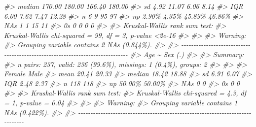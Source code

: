\documentclass[
]{book}
\newenvironment{Shaded}{\begin{snugshade}}{\end{snugshade}}
\newcommand{\CommentTok}[1]{\textcolor[rgb]{0.56,0.35,0.01}{\textit{#1}}}
\begin{document}
\begin{Shaded}
\begin{Highlighting}[]
\CommentTok{\#\textgreater{} median        170.00        180.00        166.40        180.00}
\CommentTok{\#\textgreater{} sd              4.92         11.07          6.06          8.14}
\CommentTok{\#\textgreater{} IQR             6.00          7.62          7.47         12.28}
\CommentTok{\#\textgreater{} n                  6             9            95            97}
\CommentTok{\#\textgreater{} np             2.90\%         4.35\%        45.89\%        46.86\%}
\CommentTok{\#\textgreater{} NAs                1             1            15            11}
\CommentTok{\#\textgreater{} 0s                 0             0             0             0}
\CommentTok{\#\textgreater{} }
\CommentTok{\#\textgreater{} Kruskal{-}Wallis rank sum test:}
\CommentTok{\#\textgreater{}   Kruskal{-}Wallis chi{-}squared = 99, df = 3, p{-}value \textless{}2e{-}16}
\CommentTok{\#\textgreater{} }
\CommentTok{\#\textgreater{} }
\CommentTok{\#\textgreater{} Warning:}
\CommentTok{\#\textgreater{}   Grouping variable contains 2 NAs (0.844\%).}
\CommentTok{\#\textgreater{} }
\CommentTok{\#\textgreater{} {-}{-}{-}{-}{-}{-}{-}{-}{-}{-}{-}{-}{-}{-}{-}{-}{-}{-}{-}{-}{-}{-}{-}{-}{-}{-}{-}{-}{-}{-}{-}{-}{-}{-}{-}{-}{-}{-}{-}{-}{-}{-}{-}{-}{-}{-}{-}{-}{-}{-}{-}{-}{-}{-}{-}{-}{-}{-}{-}{-}{-}{-}{-}{-}{-}{-}{-}{-}{-}{-}{-}{-}{-}{-}{-}{-}{-}{-} }
\CommentTok{\#\textgreater{} Age \textasciitilde{} Sex (.)}
\CommentTok{\#\textgreater{} }
\CommentTok{\#\textgreater{} Summary: }
\CommentTok{\#\textgreater{} n pairs: 237, valid: 236 (99.6\%), missings: 1 (0.4\%), groups: 2}
\CommentTok{\#\textgreater{} }
\CommentTok{\#\textgreater{}                       }
\CommentTok{\#\textgreater{}         Female    Male}
\CommentTok{\#\textgreater{} mean     20.41   20.33}
\CommentTok{\#\textgreater{} median   18.42   18.88}
\CommentTok{\#\textgreater{} sd        6.91    6.07}
\CommentTok{\#\textgreater{} IQR       2.48    2.37}
\CommentTok{\#\textgreater{} n          118     118}
\CommentTok{\#\textgreater{} np      50.00\%  50.00\%}
\CommentTok{\#\textgreater{} NAs          0       0}
\CommentTok{\#\textgreater{} 0s           0       0}
\CommentTok{\#\textgreater{} }
\CommentTok{\#\textgreater{} Kruskal{-}Wallis rank sum test:}
\CommentTok{\#\textgreater{}   Kruskal{-}Wallis chi{-}squared = 4.3, df = 1, p{-}value = 0.04}
\CommentTok{\#\textgreater{} }
\CommentTok{\#\textgreater{} }
\CommentTok{\#\textgreater{} Warning:}
\CommentTok{\#\textgreater{}   Grouping variable contains 1 NAs (0.422\%).}
\CommentTok{\#\textgreater{} }
\CommentTok{\#\textgreater{} {-}{-}{-}{-}{-}{-}{-}{-}{-}{-}{-}{-}{-}{-}{-}{-}{-}{-}{-}{-}{-}{-}{-}{-}{-}{-}{-}{-}{-}{-}{-}{-}{-}{-}{-}{-}{-}{-}{-}{-}{-}{-}{-}{-}{-}{-}{-}{-}{-}{-}{-}{-}{-}{-}{-}{-}{-}{-}{-}{-}{-}{-}{-}{-}{-}{-}{-}{-}{-}{-}{-}{-}{-}{-}{-}{-}{-}{-} }

\end{Highlighting}
\end{Shaded}
\end{document}
